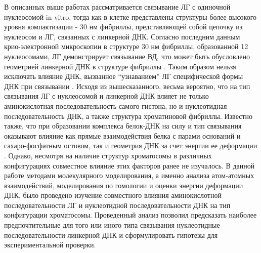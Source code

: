 В описанных выше работах рассматривается связывание ЛГ с одиночной нуклеосомой in vitro, тогда как в клетке представлены структуры более высокого уровня компактизации - 30 нм фибриллы, представляющей собой цепочку из нуклеосом и ЛГ, связанных с линкерной ДНК. Согласно последним данным крио-электронной микроскопии в структуре 30 нм фибриллы, образованной 12 нуклеосомами, ЛГ демонстрирует связывание ВД, что может быть обусловлено геометрией линкерной ДНК в структуре фибриллы \cite{bednar_structure_2017,song_cryo-em_2014}. Таким образом нельзя исключать влияние ДНК, вызванное ``узнаванием'' ЛГ специфической формы ДНК при связывании \cite{rohs_origins_2010}. 
Исходя из вышесказанного, весьма вероятно, что на тип связывания ЛГ с нуклеосомой и линкерной ДНК влияет не только аминокислотная последовательность самого гистона, но и нуклеотидная последовательность ДНК, а также структура хроматиновой фибриллы. Известно также, что при образовании комплекса белок-ДНК на силу и тип связывания оказывают влияние как прямые взаимодействия белка с парами оснований и сахаро-фосфатным остовом, так и геометрия ДНК за счет энергии ее деформации \cite{rohs_origins_2010}. Однако, несмотря на наличие структур хроматосомы в различных конфигурациях совместное влияние этих факторов ранее не изучалось.
В данной работе методами молекулярного моделирования, а именно анализа атом-атомных взаимодействий, моделирования по гомологии и оценки энергии деформации ДНК, было проведено изучение совместного влияния аминокислотной последовательности ЛГ и нуклеотидной последовательности ДНК на тип конфигурации хроматосомы. Проведенный анализ позволил предсказать наиболее предпочтительные для того или иного типа связывания нуклеотидные последовательности линкерной ДНК и сформулировать гипотезы для экспериментальной проверки.
